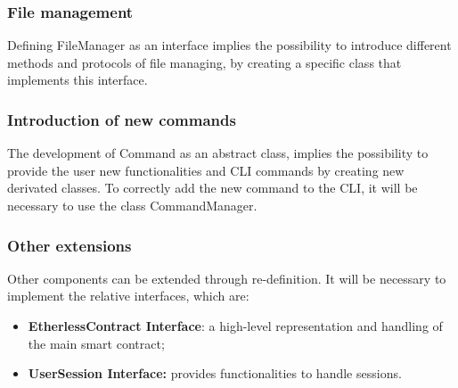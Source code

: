 \subsubsection{File management}
Defining FileManager as an interface implies the possibility to introduce different methods and protocols of file managing, by creating a specific class that implements this interface. 

\subsubsection{Introduction of new commands}
The development of Command as an abstract class, implies the possibility to provide the user new functionalities and CLI commands by creating new derivated classes. To correctly add the new command to the CLI, it will be necessary to use the class CommandManager.

\subsubsection{Other extensions}
Other components can be extended through re-definition. It will be necessary to implement the relative interfaces, which are:
\begin{itemize}
	\item \textbf{EtherlessContract Interface}: a high-level representation and handling of the main smart contract;
	\item \textbf{UserSession Interface:} provides functionalities to handle sessions.
\end{itemize}